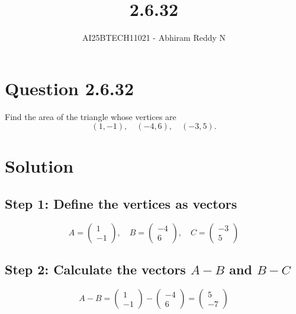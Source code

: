 \documentclass[journal]{IEEEtran}
\begin{document}

\vspace{3cm}

\title{2.6.32}
\author{AI25BTECH11021 - Abhiram Reddy N}
{\let\newpage\relax\maketitle}

\renewcommand{\thefigure}{\theenumi}
\renewcommand{\thetable}{\theenumi}
\setlength{\intextsep}{10pt} %


\renewcommand{\thetable}{\theenumi}


\section*{\textbf{Question 2.6.32}}

Find the area of the triangle whose vertices are 
\[
(1, -1), \quad (-4, 6), \quad (-3, 5).
\]

\section*{\textbf{Solution}}

\subsection*{Step 1: Define the vertices as vectors}
\[
A = \begin{pmatrix} 1 \\ -1 \end{pmatrix}, \quad
B = \begin{pmatrix} -4 \\ 6 \end{pmatrix}, \quad
C = \begin{pmatrix} -3 \\ 5 \end{pmatrix}
\]

\subsection*{Step 2: Calculate the vectors \( A - B \) and \( B - C \)}
\[
A - B = \begin{pmatrix} 1 \\ -1 \end{pmatrix} - \begin{pmatrix} -4 \\ 6 \end{pmatrix} 
= \begin{pmatrix} 5 \\ -7 \end{pmatrix}
\]
\end{document}
